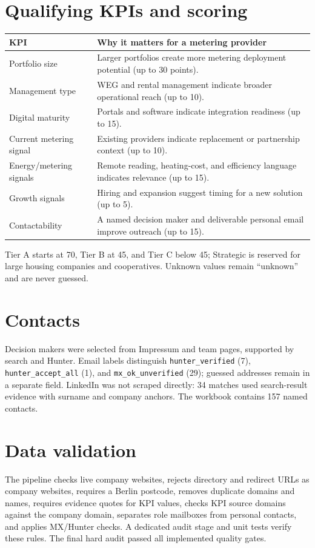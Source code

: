 \documentclass[10pt,a4paper]{article}
\begin{document}
\section{Qualifying KPIs and scoring}
\begin{tabularx}{\linewidth}{@{}lY@{}}
\toprule KPI & Why it matters for a metering provider\\\midrule
Portfolio size & Larger portfolios create more metering deployment potential (up to 30 points).\\
Management type & WEG and rental management indicate broader operational reach (up to 10).\\
Digital maturity & Portals and software indicate integration readiness (up to 15).\\
Current metering signal & Existing providers indicate replacement or partnership context (up to 10).\\
Energy/metering signals & Remote reading, heating-cost, and efficiency language indicates relevance (up to 15).\\
Growth signals & Hiring and expansion suggest timing for a new solution (up to 5).\\
Contactability & A named decision maker and deliverable personal email improve outreach (up to 15).\\
\bottomrule
\end{tabularx}
Tier A starts at 70, Tier B at 45, and Tier C below 45; Strategic is reserved for large housing companies and cooperatives. Unknown values remain ``unknown'' and are never guessed.

\section{Contacts}
Decision makers were selected from Impressum and team pages, supported by search and Hunter. Email labels distinguish \texttt{hunter\_verified} (7), \texttt{hunter\_accept\_all} (1), and \texttt{mx\_ok\_unverified} (29); guessed addresses remain in a separate field. LinkedIn was not scraped directly: 34 matches used search-result evidence with surname and company anchors. The workbook contains 157 named contacts.

\section{Data validation}
The pipeline checks live company websites, rejects directory and redirect URLs as company websites, requires a Berlin postcode, removes duplicate domains and names, requires evidence quotes for KPI values, checks KPI source domains against the company domain, separates role mailboxes from personal contacts, and applies MX/Hunter checks. A dedicated audit stage and unit tests verify these rules. The final hard audit passed all implemented quality gates.
\end{document}
